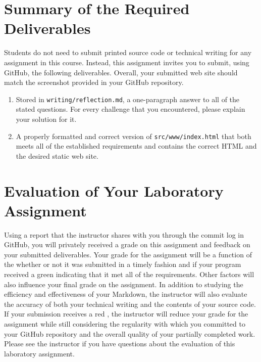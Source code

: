 \documentclass[11pt]{article}
\newcommand{\mainprogramsource}{\lstinline{src/www/index.html}}
\newcommand{\reflection}{\lstinline{writing/reflection.md}}
\newcommand{\checkmark}{\ding{51}}
\newcommand{\naughtmark}{\ding{55}}
\begin{document}
\section*{Summary of the Required Deliverables}

\noindent Students do not need to submit printed source code or technical
writing for any assignment in this course. Instead, this assignment invites you
to submit, using GitHub, the following deliverables. Overall, your submitted web
site should match the screenshot provided in your GitHub repository.

\begin{enumerate}

  \setlength{\itemsep}{0in}

\item Stored in \reflection{}, a one-paragraph answer to all of the stated
  questions. For every challenge that you encountered, please explain your
  solution for it.

\item A properly formatted and correct version of \mainprogramsource{} that both
  meets all of the established requirements and contains the correct HTML and
  the desired static web site.

\end{enumerate}

\section*{Evaluation of Your Laboratory Assignment}

Using a report that the instructor shares with you through the commit log in
GitHub, you will privately received a grade on this assignment and feedback on
your submitted deliverables. Your grade for the assignment will be a function of
the whether or not it was submitted in a timely fashion and if your program
received a green \checkmark{} indicating that it met all of the requirements.
Other factors will also influence your final grade on the assignment. In
addition to studying the efficiency and effectiveness of your Markdown, the
instructor will also evaluate the accuracy of both your technical writing and
the contents of your source code. If your submission receives a red
\naughtmark{}, the instructor will reduce your grade for the assignment while
still considering the regularity with which you committed to your GitHub
repository and the overall quality of your partially completed work. Please see
the instructor if you have questions about the evaluation of this laboratory
assignment.
\end{document}
